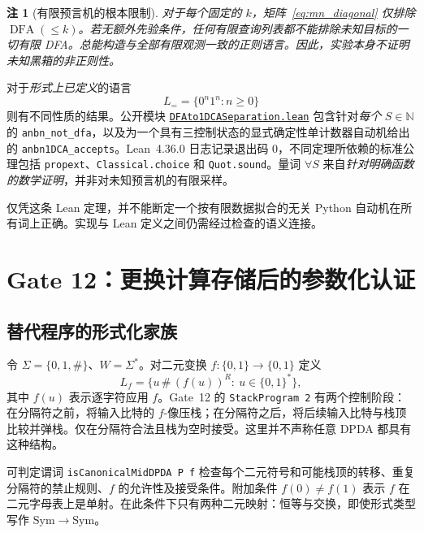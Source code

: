 \documentclass[11pt,a4paper,UTF8,fontset=none]{ctexart}
\newtheorem{remark}{注}[section]
\newcommand{\DFA}{\operatorname{DFA}}
\begin{document}
\begin{remark}[有限预言机的根本限制]\label{rem:oracle}
对于每个\emph{固定}的 $k$，矩阵~\eqref{eq:mn_diagonal} 仅排除 $\DFA(\le k)$。若无额外先验条件，任何有限查询列表都\emph{不能}排除未知目标的一切有限 DFA。总能构造与全部有限观测一致的正则语言。因此，实验本身不证明未知黑箱的非正则性。
\end{remark}

对于\emph{形式上已定义}的语言
\begin{equation}\label{eq:anbn}
L_{=}=\{0^n1^n:n\ge0\}
\end{equation}
则有不同性质的结果。公开模块 \href{https://github.com/Dnarts/proof-carrying-discovery/blob/main/formal/DFAto1DCASeparation.lean}{\texttt{DFAto1DCASeparation.lean}} 包含针对\emph{每个} $S\in\mathbb N$ 的 \texttt{anbn\_not\_dfa}，以及为一个具有三控制状态的显式确定性单计数器自动机给出的 \texttt{anbn1DCA\_accepts}。Lean~4.36.0 日志记录退出码 $0$，不同定理所依赖的标准公理包括 \texttt{propext}、\texttt{Classical.choice} 和 \texttt{Quot.sound}。量词 $\forall S$ 来自\emph{针对明确函数的数学证明}，并非对未知预言机的有限采样。

仅凭这条 Lean 定理，并不能断定一个按有限数据拟合的无关 Python 自动机在所有词上正确。实现与 Lean 定义之间仍需经过检查的语义连接。

\section{Gate 12：更换计算存储后的参数化认证}

\subsection{替代程序的形式化家族}

令 $\Sigma=\{0,1,\#\}$、$W=\Sigma^*$。对二元变换 $f:\{0,1\}\to\{0,1\}$ 定义
\begin{equation}\label{eq:mid-language}
L_f=\{u\,\#\,(f(u))^R:\ u\in\{0,1\}^*\},
\end{equation}
其中 $f(u)$ 表示逐字符应用 $f$。Gate~12 的 \texttt{StackProgram 2} 有两个控制阶段：在分隔符之前，将输入比特的 $f$-像压栈；在分隔符之后，将后续输入比特与栈顶比较并弹栈。仅在分隔符合法且栈为空时接受。这里并不声称任意 DPDA 都具有这种结构。

可判定谓词 \texttt{isCanonicalMidDPDA P f} 检查每个二元符号和可能栈顶的转移、重复分隔符的禁止规则、$f$ 的允许性及接受条件。附加条件 $f(0)\ne f(1)$ 表示 $f$ 在二元字母表上是单射。在此条件下只有两种二元映射：恒等与交换，即使形式类型写作 $\mathrm{Sym}\to\mathrm{Sym}$。
\end{document}
